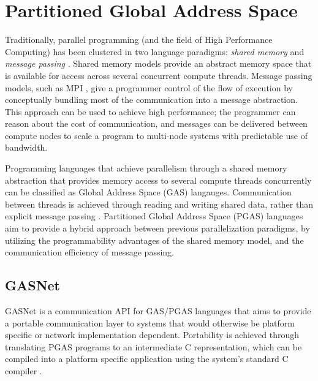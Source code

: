 \documentclass{uit-report}
\begin{document}

\newpage
\chapter{Partitioned Global Address Space}
Traditionally, parallel programming (and the field of High Performance Computing) has been clustered in two language paradigms: \emph{shared memory }and \emph{message passing} \cite{pgas_languages}.  Shared memory models provide an abstract memory space that is available for access across several concurrent compute threads. Message passing models, such as MPI \cite{MPI}, give a programmer control of the flow of execution by conceptually bundling most of the communication into a message abstraction. This approach can be used to achieve high performance; the programmer can reason about the cost of communication, and messages can be delivered between compute nodes to scale a program to multi-node systems with predictable use of bandwidth.


Programming languages that achieve parallelism through a shared memory abstraction that provides memory access to several compute threads concurrently can be classified as Global Address Space (GAS) langauges. Communication between threads is achieved through reading and writing shared data, rather than explicit message passing \cite{gasnet_description}. Partitioned Global Address Space (PGAS) languages aim to provide a hybrid approach between previous parallelization paradigms, by utilizing the programmability advantages of the shared memory model, and the communication efficiency of message passing.

\section{GASNet}
GASNet is a communication API for GAS/PGAS languages that aims to provide a portable communication layer to systems that would otherwise be platform specific or network implementation dependent. Portability is achieved through translating PGAS programs to an intermediate C representation, which can be compiled into a platform specific application using the system's standard C compiler \cite{gasnet_description}.
\end{document}
